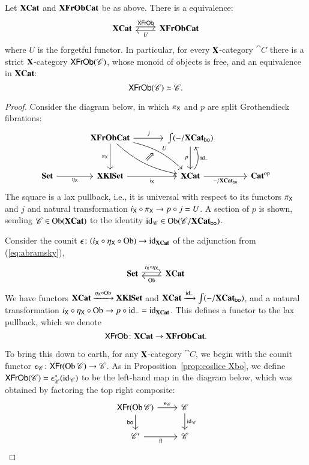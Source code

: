 \documentclass[12pt,oneside,article,draft]{memoir}
\begin{document}
\begin{proposition}\label{prop:free objects}
	Let $\mathbf{XCat}$ and $\mathbf{XFrObCat}$ be as above.
	There is a equivalence:
	$$
	\begin{tikzcd}
		\XCat\arrow[r, shift left=.5ex, "\Fun{XFrOb}"]&\Cat{XFrObCat}\arrow[l, shift left=.5ex,"U"]
	\end{tikzcd}
	$$
	where $U$ is the forgetful functor.
	In particular, for every $\mathbf{X}$-category $\cat{C}$ there is a strict $\mathbf{X}$-category $\mathsf{XFrOb}(\mathscr{C})$, whose monoid of objects is free, and an equivalence in $\mathbf{XCat}$:
		$$\mathsf{XFrOb}(\mathscr{C})\simeq\mathscr{C}.$$
\end{proposition}
\begin{proof}
	Consider the diagram below, in which $\pi_{\mathsf{X}}$ and $p$ are split Grothendieck fibrations:
	$$
	\begin{tikzcd}[row sep=large,column sep=large]
		&\Cat{XFrObCat}\ar[r,"j"]\ar[d,"\pi_{\Fun{X}}"']\ar[dr,bend left=15pt,"U"]\ar[dr,bend right=15pt]\ar[dr,phantom,"\Nearrow"]
			&\int(-/\XCat_{\bo})\ar[d,"p"'] \\
		\Set\ar[r,"\eta_{\Fun{X}}"']&\Cat{XKlSet}\ar[r,"i_{\Fun{X}}"']
			&\XCat\ar[u,bend right,"\id_{-}"']\ar[r,"-/\XCat_{\bo}"']&\op{\Cat{Cat}}
	\end{tikzcd}
	$$
	The square is a lax pullback, i.e., it is universal with respect to its functors $\pi_{\mathsf{X}}$ and $j$ and natural transformation $i_{\mathsf{X}}\circ\pi_{\mathsf{X}}\to p\circ j=U$.
	A section of $p$ is shown, sending $\mathscr{C}\in\operatorname{Ob}(\mathbf{XCat})$ to the identity $\operatorname{id}_{\mathscr{C}}\in\operatorname{Ob}(\mathscr{C}/\mathbf{XCat}_{\mathsf{bo}})$. 

	Consider the counit $\epsilon\colon (i_{\mathsf{X}}\circ\eta_{\mathsf{X}}\circ\operatorname{Ob})\to\operatorname{id}_{\mathbf{XCat}}$ of the adjunction from (\ref{eq:abramsky}),
	$$
	\begin{tikzcd}
		\Cat{Set}\arrow[r, shift left=.5ex, "i_{\Fun{X}}\circ\eta_{\Fun{X}}"]&\XCat\arrow[l, shift left=.5ex,"\Ob"]
	\end{tikzcd}
	$$
	We have functors $\mathbf{XCat}\xrightarrow{\eta_{\mathsf{X}}\circ\operatorname{Ob}}\mathbf{XKlSet}$ and $\mathbf{XCat}\xrightarrow{\operatorname{id}_{-}}\int(-/\mathbf{XCat}_{\mathsf{bo}})$, and a natural transformation $i_{\mathsf{X}}\circ\eta_{\mathsf{X}}\circ\operatorname{Ob}\to p\circ\operatorname{id}_{-}=\operatorname{id}_{\mathbf{XCat}}$.
	This defines a functor to the lax pullback, which we denote
		$$\mathsf{XFrOb}\colon\mathbf{XCat}\to\mathbf{XFrObCat}.$$

	To bring this down to earth, for any $\mathbf{X}$-category $\cat{C}$, we begin with the counit functor $\epsilon_{\mathscr{C}}\colon\mathsf{XFr}(\operatorname{Ob}\mathscr{C})\to\mathscr{C}$.
	As in Proposition~\ref{prop:coslice Xbo}, we define $\mathsf{XFrOb}(\mathscr{C})=\epsilon_{\mathscr{C}}^*(\operatorname{id}_{\mathscr{C}})$ to be the left-hand map in the diagram below, which was obtained by factoring the top right composite:
	$$
	\begin{tikzcd}
		\Fun{XFr}(\Ob\cat{C})\arrow[d, "\bo"']\arrow[r, "\epsilon_{\cat{C}}"]&\cat{C}\ar[d,"\id_{\cat{C}}"]\\
		\cat{C'}\arrow[r, "\ff"']&\cat{C}
	\end{tikzcd}
	$$


\end{proof}
\end{document}
